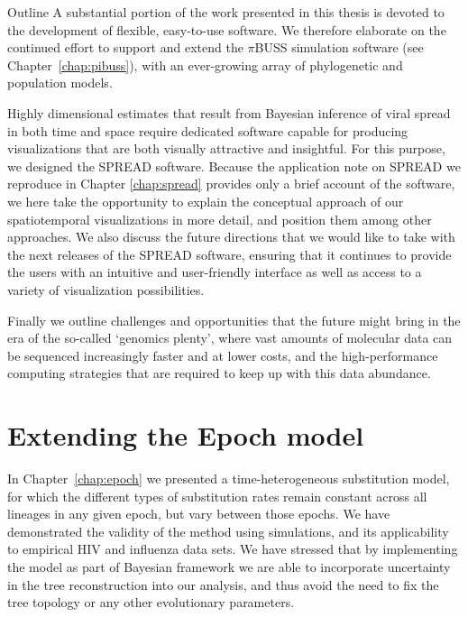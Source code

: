 \begin{remark}{Outline}
A substantial portion of the work presented in this thesis is devoted to the development of flexible, easy-to-use software.
We therefore elaborate on the continued effort to support and extend the $\pi$BUSS simulation software (see Chapter~\ref{chap:pibuss}), with an ever-growing array of phylogenetic and population models.

Highly dimensional estimates that result from Bayesian inference of viral spread in both time and space require dedicated software capable for producing visualizations that are both visually attractive and insightful.
For this purpose, we designed the SPREAD software.
Because the application note on SPREAD we reproduce in Chapter \ref{chap:spread} provides only a brief account of the software, we here take the opportunity to explain the conceptual approach of our spatiotemporal visualizations in more detail, and position them among other approaches.
We also discuss the future directions that we would like to take with the next releases of the SPREAD software, ensuring that it continues to provide the users with an intuitive and user-friendly interface as well as access to a variety of visualization possibilities.

Finally we outline challenges and opportunities that the future might bring in the era of the so-called `genomics plenty', where vast amounts of molecular data can be sequenced increasingly faster and at lower costs, and the high-performance computing strategies that are required to keep up with this data abundance.
\end{remark}

\section{Extending the Epoch model\label{sec:extend_epoch}}

In Chapter~\ref{chap:epoch} we presented a time-heterogeneous substitution model, for which the different types of substitution rates %
remain constant across all lineages in any given epoch, but vary between those epochs.
We have demonstrated the validity of the method using simulations, and its applicability to empirical HIV and influenza data sets.
We have stressed that by implementing the model as part of Bayesian framework we are able to incorporate uncertainty in the tree reconstruction into our analysis, and thus avoid the need to fix the tree topology or any other evolutionary parameters.

